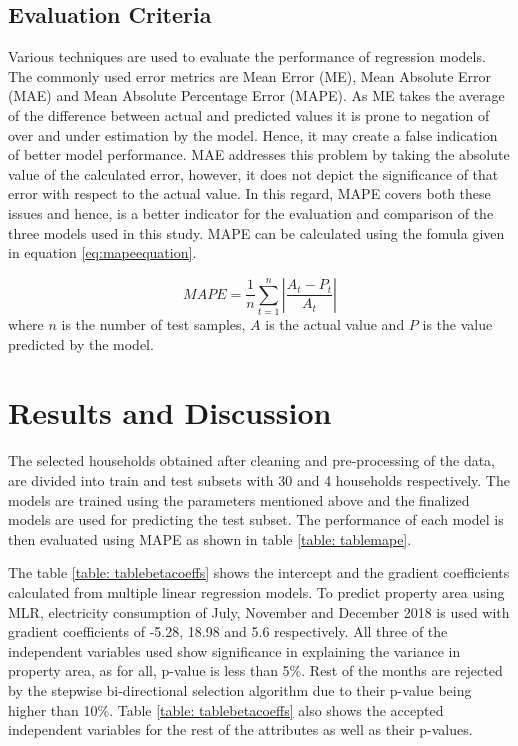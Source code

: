 \documentclass[conference]{IEEEtran}
\begin{document}
\subsection{Evaluation Criteria}
Various techniques are used to evaluate the performance of regression models. The commonly used error metrics are  Mean Error (ME), Mean Absolute Error (MAE) and Mean Absolute Percentage Error (MAPE). As ME takes the average of the difference between actual and predicted values it is prone to negation of over and under estimation by the model. Hence, it may create a false indication of better model performance. MAE addresses this problem by taking the absolute value of the calculated error, however, it does not depict the significance of that error with respect to the actual value. In this regard, MAPE covers both these issues and hence, is a better indicator for the evaluation and comparison of the three models used in this study. MAPE can be calculated using the fomula given in equation \ref{eq:mapeequation}.

\begin{equation}
    MAPE = \frac{1}{n}\sum_{t = 1}^{n}\displaystyle\left\lvert \frac{A_t - P_t}{A_t} \right\rvert
    \label{eq:mapeequation}
\end{equation}
where \(n\) is the number of test samples, \(A\) is the actual value and \(P\) is the value predicted by the model.




\section{Results and Discussion}

The selected households obtained after cleaning and pre-processing of the data, are divided into train and test subsets with 30 and 4 households respectively. The models are trained using the parameters mentioned above and the finalized models are used for predicting the test subset. The performance of each model is then evaluated using MAPE as shown in table \ref{table: tablemape}.  

The table \ref{table: tablebetacoeffs} shows the intercept and the gradient coefficients calculated from multiple linear regression models. To predict property area using MLR, electricity consumption of July, November and December 2018 is used with gradient coefficients of -5.28, 18.98 and 5.6 respectively. All three of the independent variables used show significance in explaining the variance in property area, as for all, p-value is less than 5\%. Rest of the months are rejected by the stepwise bi-directional selection algorithm due to their p-value being higher than 10\%. Table \ref{table: tablebetacoeffs} also shows the accepted independent variables for the rest of the attributes as well as their p-values. 
\end{document}
